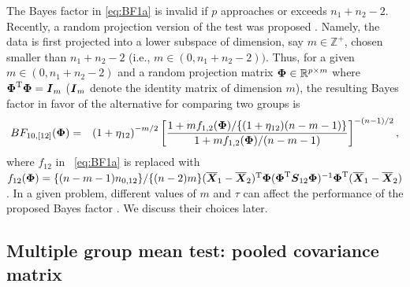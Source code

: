 \documentclass[times,sort&compress,3p]{elsarticle}
\theoremstyle{plain}%
\theoremstyle{definition}
\def\be{\begin{eqnarray}}
\def\ee{\end{eqnarray}}
\def\trans{^{\rm T}}
\newcommand{\uI}       {\mbox{\boldmath$I$}}
\newcommand{\uS}       {\mbox{\boldmath$S$}}
\newcommand{\uX}       {\mbox{\boldmath$X$}}
\newcommand{\uPhi}              {\mbox{\boldmath$\Phi$}}
\begin{document}
The Bayes factor in \eqref{eq:BF1a} is invalid if $p$ approaches or exceeds $n_1 + n_2 - 2$. Recently, a random projection version of the test was proposed \cite{srivastava2014raptt,zoh2018powerful}. Namely, the data is first projected into a lower subspace of dimension, say $m \in \mathbb{Z}^{+}$, chosen smaller than $n_1 + n_2 -2$ (i.e., $m \in (0, n_1 + n_2 - 2))$. Thus, for a given $m \in (0, n_1 + n_2 - 2)$ and a random projection matrix $\uPhi \in \mathbb{R}^{p \times m}$ where $\uPhi\trans\uPhi = \uI_{m}$ ($\uI_{m}$ denote the identity matrix of dimension $m$), the resulting Bayes factor in favor of the alternative for comparing two groups is 
\be
BF_{10,[12]}(\uPhi) &=& \left(1 + \eta_{12} \right)^{-m/2} \left[\frac{  1 + {m f_{1,2}(\uPhi)}/\{(1 + \eta_{12})(n-m-1)\}}{ 1 + {m f_{1,2}(\uPhi)}/{(n-m-1)}  } \right]^{-(n-1)/2}, \label{eq:BF1}
\ee
where $f_{12}$ in ~\eqref{eq:BF1a} is replaced with $f_{12}(\uPhi) = \{(n-m-1)n_{0,12} \}/\{(n-2)m\} (\overline{\uX}_1 - \overline{\uX}_2)\trans\uPhi(\uPhi\trans\uS_{12}\uPhi)^{-1}\uPhi\trans(\overline{\uX}_1 - \overline{\uX}_2)$. 
In a given problem, different values of $m$ and $\tau$ can affect the performance of the proposed Bayes factor \cite{zoh2018powerful}. We discuss their choices later. 

\subsection{Multiple group mean test: pooled covariance matrix} \label{sec:testpl}
\end{document}
